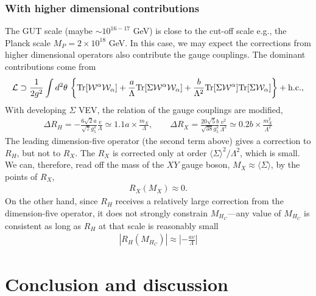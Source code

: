 \documentclass[12pt]{article}
\newcommand{\1}{\mbox{1}\hspace{-0.25em}\mbox{l}}
\begin{document}
\subsubsection{With higher dimensional contributions}
The GUT scale (maybe  $\sim 10^{16-17}$ GeV) is close to the cut-off scale e.g., the Planck scale $M_P = 2\times 10^{18}$ GeV.
In this case, we may expect the corrections from higher dimensional operators also contribute the gauge couplings.
The dominant contributions come from 
\begin{align}
  {\cal L} \supset \frac{1}{2 g^2} \int d^2\theta\, 
      \left\{ {\rm Tr}[{\cal W}^\alpha {\cal W}_\alpha] 
    + \frac{a}{\Lambda} {\rm Tr}[\Sigma {\cal W}^\alpha {\cal W}_\alpha] 
    + \frac{b}{\Lambda^2}{\rm Tr}[\Sigma {\cal W}^\alpha ] {\rm Tr}[\Sigma {\cal W}_\alpha ]
     \right\}
    + {\rm h.c.},
\label{eq:threshold}
\end{align}
With developing $\Sigma$ VEV, the relation of the gauge couplings are modified,
\begin{align}
\Delta R_H = -\frac{6\sqrt{2}a}{\sqrt{7}g_5^2} \frac{v}{\Lambda} \simeq 1.1 a \times \frac{m_X}{\Lambda}
,\qquad
\Delta R_X = \frac{20\sqrt{5}b}{ \sqrt{38}g_5^2} \frac{v^2}{\Lambda^2}
\simeq 0.2 b \times\frac{m_X^2}{\Lambda^2}
\end{align}
The leading dimension-five operator (the second term above) gives 
a correction to $R_H$, but not to $R_X$. The $R_X$ is corrected only at 
order $\langle \Sigma \rangle^2/\Lambda^2$, which is small.  We can, 
therefore, read off the mass of the $XY$ gauge boson, $M_X \approx 
\langle \Sigma \rangle$, by the points of $R_X$,
%
\begin{align}
  R_X(M_X) \approx 0.
\label{eq:R_X-M_X}
\end{align}
%
On the other hand, since $R_H$ receives a relatively large correction from 
the dimension-five operator, it does not strongly constrain $M_{H_C}$---any 
value of $M_{H_C}$ is consistent as long as $R_H$ at that scale is reasonably 
small
%
\begin{align}
  \left| R_H(M_{H_C}) \right| 
  \approx \left| -\frac{a v}{\Lambda} \right| 
\label{eq:R_H-M_H}
\end{align}
%


\section{Conclusion and discussion}
\label{sec:conclusion}
\end{document}

